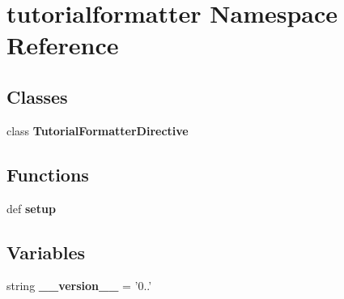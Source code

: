 \section{tutorialformatter Namespace Reference}
\label{namespacetutorialformatter}
\subsection*{Classes}
\begin{DoxyCompactItemize}
\item 
class {\bf Tutorial\-Formatter\-Directive}
\end{DoxyCompactItemize}
\subsection*{Functions}
\begin{DoxyCompactItemize}
\item 
def {\bfseries setup}\label{namespacetutorialformatter_a766f79374e321a54001dbb77eabbde2f}

\end{DoxyCompactItemize}
\subsection*{Variables}
\begin{DoxyCompactItemize}
\item 
string {\bfseries \-\_\-\-\_\-version\-\_\-\-\_\-} = '0..'\label{namespacetutorialformatter_a723546ef58295d147acc7c3b46e144d8}

\end{DoxyCompactItemize}


